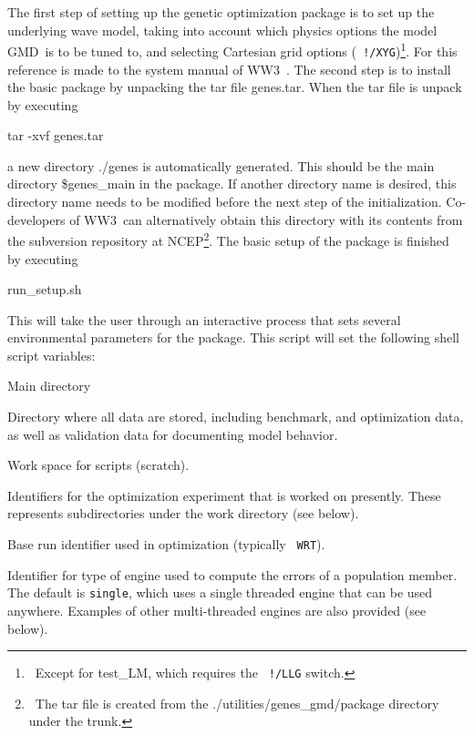 \documentclass[12pt]{article}
\newcommand{\ws}{WW3}
\newcommand{\gmd}{GMD}
\newcommand{\file}{\sf}
\newcommand{\code}{\tt}
\newenvironment{plist}{\begin{list}{nofile ?}{\parsep 0mm
            \itemsep 0mm \leftmargin 35mm \labelwidth 25mm
            \rightmargin 10mm}}{\end{list}}
\newcommand{\pit}[2]{\item[{\code{#1}}\hfill]{#2}}
\begin{document}
The first step of setting up the genetic optimization package is to set up the
underlying wave model, taking into account which physics options the model
\gmd\ is to be tuned to, and selecting Cartesian grid options ({\code
!/XYG})\footnote{~Except for {\file test\_LM}, which requires the {\code
!/LLG} switch.}. For this reference is made to the system manual of \ws\
\citep{tol:MMAB09a}. The second step is to install the basic package by
unpacking the tar file {\file genes.tar}. When the tar file is unpack by
executing
\begin{center}
{\file tar -xvf genes.tar}
\end{center}
\noindent
a new directory {\file ./genes} is automatically generated. This should be the
main directory {\file \$genes\_main} in the package. If another directory name
is desired, this directory name needs to be modified before the next step of
the initialization. Co-developers of \ws\ can alternatively obtain this
directory with its contents from the subversion repository at
NCEP\footnote{~The tar file is created from the ./utilities/genes\_gmd/package
directory under the trunk.}.  The basic setup of the package is finished by
executing
\begin{center}
{\file run\_setup.sh}
\end{center}
\noindent
This will take the user through an interactive process that sets several
environmental parameters for the package. This script will set the following
shell script variables:

\begin{plist}
\pit{\$genes\_main}{Main directory}
\pit{\$genes\_data}{Directory where all data are stored, including benchmark,
                    and optimization data, as well as validation data for
		    documenting model behavior.}
\pit{\$genes\_work}{Work space for scripts (scratch).}
\pit{\$genes\_expN}{Identifiers for the optimization experiment that is worked
                    on presently. These represents subdirectories under the
                    work directory (see below).}
\pit{\$genes\_base}{Base run identifier used in optimization (typically {\code
                    WRT}).}
\pit{\$genes\_engn}{Identifier for type of engine used to compute the errors
                    of a population member. The default is {\code single},
                    which uses a single threaded engine that can be used
                    anywhere. Examples of other multi-threaded engines are
                    also provided (see below).}
\end{plist}
\end{document}
